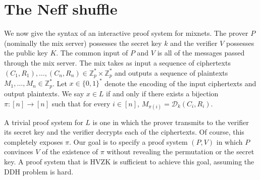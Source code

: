 \documentclass[letter]{article}
\newcommand{\Zmodp}{\mathbb{Z}_p}
\newcommand{\bits}{\{0,1\}}
\newcommand*\by{\times}
\newcommand{\pk}{K}
\newcommand{\sk}{k}
\newcommand{\varm}{M}
\newcommand{\varc}{C}
\newcommand{\varr}{R}
\newcommand{\dec}{\mathcal{D}}
\begin{document}
\section{The Neff shuffle} \label{section:neff-shuffle}

We now give the syntax of an interactive proof system for mixnets. The prover
$P$ (nominally the mix server) possesses the secret key $\sk$ and the verifier
$V$ possesses the public key $\pk$. The common input of $P$ and $V$ is all of
the messages passed through the mix server. The mix takes as input a sequence of
ciphertexts $(\varc_1, \varr_1), \ldots, (\varc_n, \varr_n) \in \Zmodp^* \by
\Zmodp^*$ and outputs a sequence of plaintexts $\varm_{1}, \ldots, \varm_{n} \in
\Zmodp^*$. Let $x \in \bits^*$ denote the encoding of the input ciphertexts and
output plaintexts. We say $x \in L$ if and only if there exists a bijection $\pi
: [n] \rightarrow [n] $ such that for every $i \in [n]$,
$\varm_{\pi(i)} = \dec_k(\varc_{i}, \varr_{i})$.

A trivial proof system for $L$ is one in which the prover transmits to the
verifier its secret key and the verifier decrypts each of the ciphertexts. Of
course, this completely exposes $\pi$. Our goal is to specify a proof system
$(P, V)$ in which $P$ convinces $V$ of the existence of $\pi$ without revealing
the permutation or the secret key. A proof system that is HVZK is sufficient to
achieve this goal, assuming the DDH problem is hard.
\end{document}
